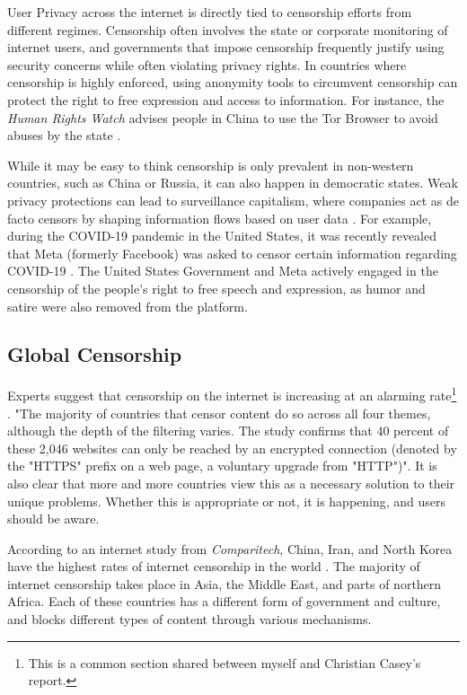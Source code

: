 User Privacy across the internet is directly tied to censorship efforts from different regimes. Censorship often involves the state or corporate monitoring of internet users, and governments that impose censorship frequently justify using security concerns while often violating privacy rights. In countries where censorship is highly enforced, using anonymity tools to circumvent censorship can protect the right to free expression and access to information. For instance, the \textit{Human Rights Watch} advises people in China to use the Tor Browser to avoid abuses by the state \cite{Privacy2017}.

While it may be easy to think censorship is only prevalent in non-western countries, such as China or Russia, it can also happen in democratic states. Weak privacy protections can lead to surveillance capitalism, where companies act as de facto censors by shaping information flows based on user data \cite{schwartz1999internet}. For example, during the COVID-19 pandemic in the United States, it was recently revealed that Meta (formerly Facebook) was asked to censor certain information regarding COVID-19 \cite{pbsZuckerbergSays}. The United States Government and Meta actively engaged in the censorship of the people's right to free speech and expression, as humor and satire were also removed from the platform.

\subsection{Global Censorship}
\label{sec:Chris-Global-Censorship}

Experts suggest that censorship on the internet is increasing at an alarming rate\footnote{This is a common section shared between myself and Christian Casey’s report.}  \cite{zittrain2017shifting}. "The majority of countries that censor content do so across all four themes, although the depth of the filtering varies. The study confirms that 40 percent of these 2,046 websites can only be reached by an encrypted connection (denoted by the "HTTPS" prefix on a web page, a voluntary upgrade from "HTTP")". It is also clear that more and more countries view this as a necessary solution to their unique problems. Whether this is appropriate or not, it is happening, and users should be aware.  

According to an internet study from \textit{Comparitech}, China, Iran, and North Korea have the highest rates of internet censorship in the world \cite{comparitechInternetCensorship}. The majority of internet censorship takes place in Asia, the Middle East, and parts of northern Africa. Each of these countries has a different form of government and culture, and blocks different types of content through various mechanisms. 



